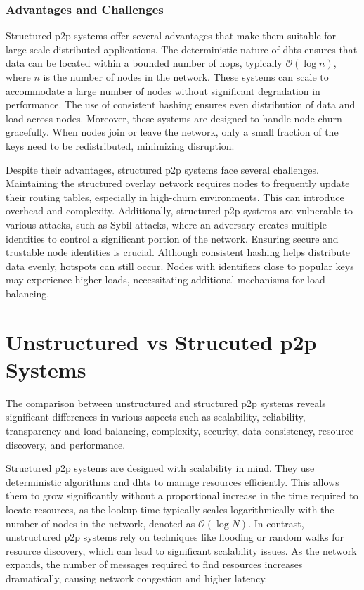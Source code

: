 \subsubsection*{Advantages and Challenges}
Structured \gls{p2p} systems offer several advantages that make them suitable for large-scale distributed applications.
The deterministic nature of \glspl{dht} ensures that data can be located within a bounded number of hops, typically $\mathcal{O}(\log n)$, where $n$ is the number of nodes in the network.
These systems can scale to accommodate a large number of nodes without significant degradation in performance.
The use of consistent hashing ensures even distribution of data and load across nodes.
Moreover, these systems are designed to handle node churn gracefully.
When nodes join or leave the network, only a small fraction of the keys need to be redistributed, minimizing disruption.

Despite their advantages, structured \gls{p2p} systems face several challenges.
Maintaining the structured overlay network requires nodes to frequently update their routing tables, especially in high-churn environments.
This can introduce overhead and complexity.
Additionally, structured \gls{p2p} systems are vulnerable to various attacks, such as Sybil attacks, where an adversary creates multiple identities to control a significant portion of the network.
Ensuring secure and trustable node identities is crucial.
Although consistent hashing helps distribute data evenly, hotspots can still occur.
Nodes with identifiers close to popular keys may experience higher loads, necessitating additional mechanisms for load balancing.

\section{Unstructured vs Strucuted \gls{p2p} Systems}
The comparison between unstructured and structured \gls{p2p} systems reveals significant differences in various aspects such as scalability, reliability, transparency and load balancing, complexity, security, data consistency, resource discovery, and performance.

Structured \gls{p2p} systems are designed with scalability in mind.
They use deterministic algorithms and \glspl{dht} to manage resources efficiently.
This allows them to grow significantly without a proportional increase in the time required to locate resources, as the lookup time typically scales logarithmically with the number of nodes in the network, denoted as \(\mathcal{O}(\log N)\).
In contrast, unstructured \gls{p2p} systems rely on techniques like flooding or random walks for resource discovery, which can lead to significant scalability issues.
As the network expands, the number of messages required to find resources increases dramatically, causing network congestion and higher latency.

